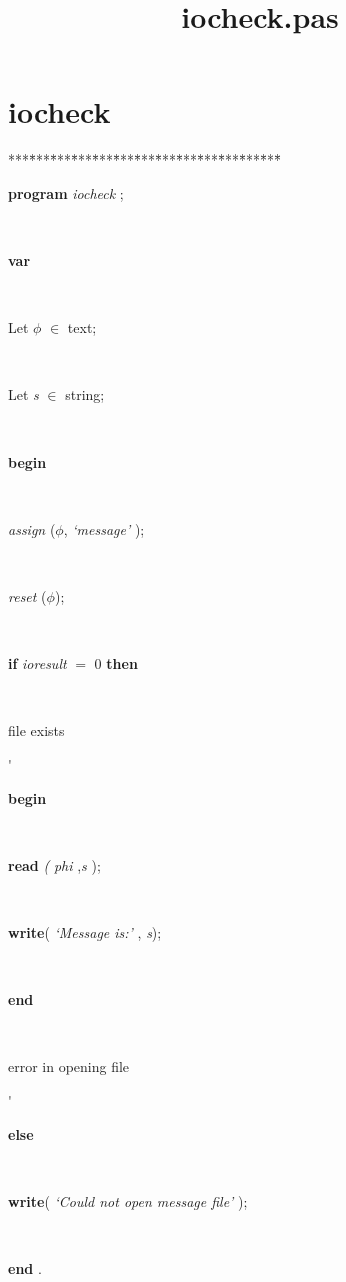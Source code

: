 \documentclass[10pt, a4paper]{article}
\title{iocheck.pas}
\begin{document}
\maketitle

\tableofcontents
\section{iocheck}
\begin{tabbing}
***\=***\=***\=***\=***\=***\=***\=***\=***\=***\=***\=***\=***\=\kill
\parbox{14cm}{\textsf{\textbf{program}  \textit{iocheck} ;}}\\
\+\parbox{14cm}{\textsf{\textbf{var} }}\\
\parbox{14cm}{\textsf{Let \textit{$\phi$} $\in$ text;}}\\
\parbox{14cm}{\textsf{Let \textit{s} $\in$ string;}}\\
\-\<\+\parbox{14cm}{\textsf{\textbf{begin} }}\\
\parbox{14cm}{\textsf{\textit{assign} (\textit{$\phi$}, \textit{\textrm{\textup { `message' } }})}; }\\
\parbox{14cm}{\textsf{\textit{reset} (\textit{$\phi$})}; }\\
\+\parbox{14cm}{\textsf {\textbf {if } \textsf{\textit{ioresult} $=$ 0} \textbf{ then } }}\\
\<\<\parbox{3.5cm}{\scriptsize{file exists}}\'\>\parbox{14cm}{\textsf{\textbf{begin} }}\\
\parbox{14cm}{\textsf{\textbf{read} \textit{(} \textit{phi} ,\textit{s} );}}\\
\parbox{14cm}{\textsf{\textbf{write}(\textit{\textrm{\textup { `Message is:' } }}, \textit{s})}; }\\
\<\-\parbox{14cm}{\textsf{\textbf{end} }}\\
\+\<\parbox{3.5cm}{\scriptsize{error in opening file}}\'\>\parbox{14cm}{\textsf{\textbf{else} }}\\
\-\parbox{14cm}{\textsf{\textbf{write}(\textit{\textrm{\textup { `Could not open message file' } }})}; }\\
\<\-\parbox{14cm}{\textsf{\textbf{end} .}}\\
\\
\\
\end{tabbing}
\end{document}
